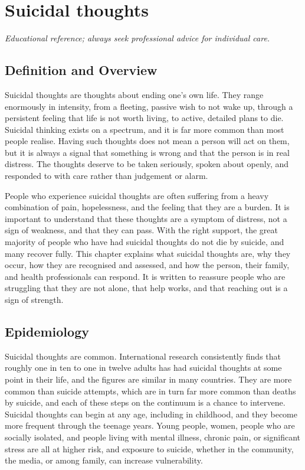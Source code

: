 \chapter{Suicidal thoughts}

\medskip
\noindent\textit{Educational reference; always seek professional advice for individual care.}

\section*{Definition and Overview}
Suicidal thoughts are thoughts about ending one's own life. They range enormously in intensity, from a fleeting, passive wish to not wake up, through a persistent feeling that life is not worth living, to active, detailed plans to die. Suicidal thinking exists on a spectrum, and it is far more common than most people realise. Having such thoughts does not mean a person will act on them, but it is always a signal that something is wrong and that the person is in real distress. The thoughts deserve to be taken seriously, spoken about openly, and responded to with care rather than judgement or alarm.

People who experience suicidal thoughts are often suffering from a heavy combination of pain, hopelessness, and the feeling that they are a burden. It is important to understand that these thoughts are a symptom of distress, not a sign of weakness, and that they can pass. With the right support, the great majority of people who have had suicidal thoughts do not die by suicide, and many recover fully. This chapter explains what suicidal thoughts are, why they occur, how they are recognised and assessed, and how the person, their family, and health professionals can respond. It is written to reassure people who are struggling that they are not alone, that help works, and that reaching out is a sign of strength.

\section*{Epidemiology}
Suicidal thoughts are common. International research consistently finds that roughly one in ten to one in twelve adults has had suicidal thoughts at some point in their life, and the figures are similar in many countries. They are more common than suicide attempts, which are in turn far more common than deaths by suicide, and each of these steps on the continuum is a chance to intervene. Suicidal thoughts can begin at any age, including in childhood, and they become more frequent through the teenage years. Young people, women, people who are socially isolated, and people living with mental illness, chronic pain, or significant stress are all at higher risk, and exposure to suicide, whether in the community, the media, or among family, can increase vulnerability.

